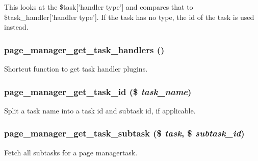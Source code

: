This looks at the \$task\mbox{[}'handler type'\mbox{]} and compares that to \$task\_\-handler\mbox{[}'handler type'\mbox{]}. If the task has no type, the id of the task is used instead. \hypertarget{page__manager_8module_a6c34e1fe242a3d9c0b652a159ab5e065}{
\subsubsection[{page\_\-manager\_\-get\_\-task\_\-handlers}]{\setlength{\rightskip}{0pt plus 5cm}page\_\-manager\_\-get\_\-task\_\-handlers ()}}
\label{page__manager_8module_a6c34e1fe242a3d9c0b652a159ab5e065}
Shortcut function to get task handler plugins. \hypertarget{page__manager_8module_a8c0daf8839fb3d464ee6a8303a5b27d5}{
\subsubsection[{page\_\-manager\_\-get\_\-task\_\-id}]{\setlength{\rightskip}{0pt plus 5cm}page\_\-manager\_\-get\_\-task\_\-id (\$ {\em task\_\-name})}}
\label{page__manager_8module_a8c0daf8839fb3d464ee6a8303a5b27d5}
Split a task name into a task id and subtask id, if applicable. \hypertarget{page__manager_8module_a4134a18da6e1f9b2d6d3ddca2d77e23d}{
\subsubsection[{page\_\-manager\_\-get\_\-task\_\-subtask}]{\setlength{\rightskip}{0pt plus 5cm}page\_\-manager\_\-get\_\-task\_\-subtask (\$ {\em task}, \/  \$ {\em subtask\_\-id})}}
\label{page__manager_8module_a4134a18da6e1f9b2d6d3ddca2d77e23d}
Fetch all subtasks for a page managertask.


